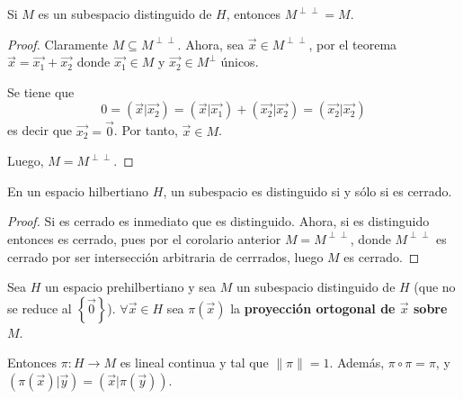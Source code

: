 \documentclass[12pt]{report}
\newcounter{it}
\theoremstyle{largebreak}
\newcommand\cf[3]{\ensuremath{#1:#2\rightarrow#3}}
\newcommand\norm[1]{\ensuremath{\|#1\|}}
\newcommand\pint[2]{\ensuremath{\left(#1\big| #2\right)}}
\begin{document}
    \begin{propo}
        Si $M$ es un subespacio distinguido de $H$, entonces $M^{\perp\perp}=M$.
    \end{propo}

    \begin{proof}
        Claramente $M\subseteq M^{\perp\perp}$. Ahora, sea $\vec{x}\in M^{\perp\perp}$, por el teorema $\vec{x}=\vec{x_1}+\vec{x_2}$ donde $\vec{x_1}\in M$ y $\vec{x_2}\in M^\perp$ únicos.

        Se tiene que
        \begin{equation*}
            0=\pint{\vec{x}}{\vec{x_2}}=\pint{\vec{x}}{\vec{x_1}}+\pint{\vec{x_2}}{\vec{x_2}}=\pint{\vec{x_2}}{\vec{x_2}}
        \end{equation*}
        es decir que $\vec{x_2}=\vec{0}$. Por tanto, $\vec{x}\in M$.

        Luego, $M=M^{\perp\perp}$.
    \end{proof}

    \begin{cor}
        En un espacio hilbertiano $H$, un subespacio es distinguido si y sólo si es cerrado.
    \end{cor}

    \begin{proof}
        Si es cerrado es inmediato que es distinguido. Ahora, si es distinguido entonces es cerrado, pues por el corolario anterior $M=M^{\perp\perp}$, donde $M^{\perp\perp}$ es cerrado por ser intersección arbitraria de cerrrados, luego $M$ es cerrado.
    \end{proof}

    \begin{propo}
        Sea $H$ un espacio prehilbertiano y sea $M$ un subespacio distinguido de $H$ (que no se reduce al $\left\{\vec{0} \right\}$). $\forall\vec{x}\in H$ sea $\pi(\vec{x})$ la \textbf{proyección ortogonal de $\vec{x}$ sobre $M$}.

        Entonces $\cf{\pi}{H}{M}$ es lineal continua y tal que $\norm{\pi}=1$. Además, $\pi\circ\pi=\pi$, y $\pint{\pi(\vec{x})}{\vec{y}}=\pint{\vec{x}}{\pi(\vec{y})}$.
    \end{propo}
\end{document}
